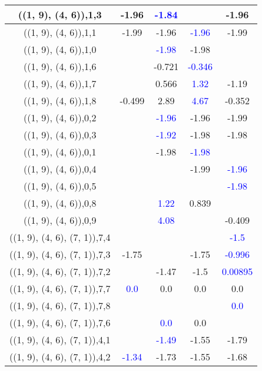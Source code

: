 \documentclass{article}
\begin{document}
\begin{center}
\begin{longtable}{|c|c|c|c|c|}
        	\hline
        	((1, 9), (4, 6)),1,3&-1.96& \textcolor{blue}{-1.84}&&-1.96\\
        	\hline
        	((1, 9), (4, 6)),1,1&-1.99&-1.96& \textcolor{blue}{-1.96}&-1.99\\
        	\hline
        	((1, 9), (4, 6)),1,0&& \textcolor{blue}{-1.98}&-1.98&\\
        	\hline
        	((1, 9), (4, 6)),1,6&&-0.721& \textcolor{blue}{-0.346}&\\
        	\hline
        	((1, 9), (4, 6)),1,7&&0.566& \textcolor{blue}{1.32}&-1.19\\
        	\hline
        	((1, 9), (4, 6)),1,8&-0.499&2.89& \textcolor{blue}{4.67}&-0.352\\
        	\hline
        	((1, 9), (4, 6)),0,2&& \textcolor{blue}{-1.96}&-1.96&-1.99\\
        	\hline
        	((1, 9), (4, 6)),0,3&& \textcolor{blue}{-1.92}&-1.98&-1.98\\
        	\hline
        	((1, 9), (4, 6)),0,1&&-1.98& \textcolor{blue}{-1.98}&\\
        	\hline
        	((1, 9), (4, 6)),0,4&&&-1.99& \textcolor{blue}{-1.96}\\
        	\hline
        	((1, 9), (4, 6)),0,5&&&& \textcolor{blue}{-1.98}\\
        	\hline
        	((1, 9), (4, 6)),0,8&& \textcolor{blue}{1.22}&0.839&\\
        	\hline
        	((1, 9), (4, 6)),0,9&& \textcolor{blue}{4.08}&&-0.409\\
        	\hline
        	((1, 9), (4, 6), (7, 1)),7,4&&&& \textcolor{blue}{-1.5}\\
        	\hline
        	((1, 9), (4, 6), (7, 1)),7,3&-1.75&&-1.75& \textcolor{blue}{-0.996}\\
        	\hline
        	((1, 9), (4, 6), (7, 1)),7,2&&-1.47&-1.5& \textcolor{blue}{0.00895}\\
        	\hline
        	((1, 9), (4, 6), (7, 1)),7,7& \textcolor{blue}{0.0}&0.0&0.0&0.0\\
        	\hline
        	((1, 9), (4, 6), (7, 1)),7,8&&&& \textcolor{blue}{0.0}\\
        	\hline
        	((1, 9), (4, 6), (7, 1)),7,6&& \textcolor{blue}{0.0}&0.0&\\
        	\hline
        	((1, 9), (4, 6), (7, 1)),4,1&& \textcolor{blue}{-1.49}&-1.55&-1.79\\
        	\hline
        	((1, 9), (4, 6), (7, 1)),4,2& \textcolor{blue}{-1.34}&-1.73&-1.55&-1.68\\

\end{longtable}
\end{center}
\end{document}
